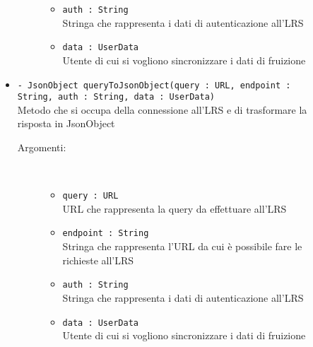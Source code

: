 \documentclass[../Tesi.tex]{subfiles}
\begin{document}
\begin{description}
\begin{itemize}
\begin{description}
\begin{itemize}
						\item \texttt{auth : String}\\
						Stringa che rappresenta i dati di autenticazione all'LRS

						\item \texttt{data : UserData}\\
						Utente di cui si vogliono sincronizzare i dati di fruizione
					\end{itemize}
				\end{description}

				\item \texttt{- JsonObject queryToJsonObject(query : URL, endpoint : String, auth : String, data : UserData)}\\
				Metodo che si occupa della connessione all'LRS e di trasformare la risposta in JsonObject
				\begin{description}
					\item[Argomenti:] \
					\begin{itemize}
						\item \texttt{query : URL}\\
						URL che rappresenta la query da effettuare all'LRS

						\item \texttt{endpoint : String}\\
						Stringa che rappresenta l'URL da cui è possibile fare le richieste all'LRS

						\item \texttt{auth : String}\\
						Stringa che rappresenta i dati di autenticazione all'LRS

						\item \texttt{data : UserData}\\
						Utente di cui si vogliono sincronizzare i dati di fruizione
					\end{itemize}
				\end{description}

			\end{itemize}
		\end{description}
\end{document}
